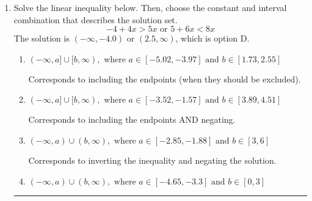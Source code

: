 \documentclass{extbook}[14pt]
\newcommand{\litem}[1]{\item #1

\rule{\textwidth}{0.4pt}}
\begin{document}
\begin{enumerate}
{\begin{enumerate}[label=\Alph*.]
$(8.00, 2.60]$, which is the correct interval but negatives of the actual endpoints.
\item \( (-\infty, a) \cup [b, \infty), \text{ where } a \in [6.75, 9.75] \text{ and } b \in [-1.5, 6] \)

$(-\infty, 8.00) \cup [2.60, \infty)$, which corresponds to displaying the and-inequality as an or-inequality and getting negatives of the actual endpoints.
\item \( [a, b), \text{ where } a \in [5.25, 12.75] \text{ and } b \in [0, 6.75] \)

$[8.00, 2.60)$, which corresponds to flipping the inequality and getting negatives of the actual endpoints.
\item \( (-\infty, a] \cup (b, \infty), \text{ where } a \in [7.5, 11.25] \text{ and } b \in [0.75, 4.5] \)

$(-\infty, 8.00] \cup (2.60, \infty)$, which corresponds to displaying the and-inequality as an or-inequality AND flipping the inequality AND getting negatives of the actual endpoints.
\item \( \text{None of the above.} \)

* This is correct as the answer should be $(-8.00, -2.60]$.
\end{enumerate}

\textbf{General Comment:} To solve, you will need to break up the compound inequality into two inequalities. Be sure to keep track of the inequality! It may be best to draw a number line and graph your solution.
}
\litem{
Solve the linear inequality below. Then, choose the constant and interval combination that describes the solution set.
\[ -4 + 4 x > 5 x \text{ or } 5 + 6 x < 8 x \]The solution is \( (-\infty, -4.0) \text{ or } (2.5, \infty) \), which is option D.\begin{enumerate}[label=\Alph*.]
\item \( (-\infty, a] \cup [b, \infty), \text{ where } a \in [-5.02, -3.97] \text{ and } b \in [1.73, 2.55] \)

Corresponds to including the endpoints (when they should be excluded).
\item \( (-\infty, a] \cup [b, \infty), \text{ where } a \in [-3.52, -1.57] \text{ and } b \in [3.89, 4.51] \)

Corresponds to including the endpoints AND negating.
\item \( (-\infty, a) \cup (b, \infty), \text{ where } a \in [-2.85, -1.88] \text{ and } b \in [3, 6] \)

Corresponds to inverting the inequality and negating the solution.
\item \( (-\infty, a) \cup (b, \infty), \text{ where } a \in [-4.65, -3.3] \text{ and } b \in [0, 3] \)


\end{enumerate}}
\end{enumerate}
\end{document}
